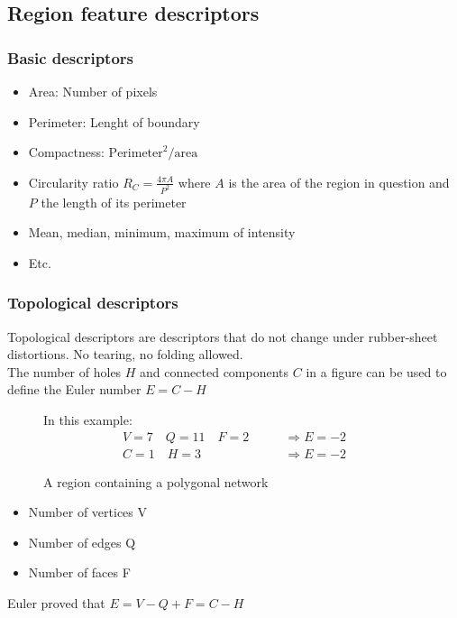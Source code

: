\subsection{Region feature descriptors}
\subsubsection{Basic descriptors}
\begin{itemize}
\item Area: Number of pixels
\item Perimeter: Lenght of boundary
\item Compactness: $\text{Perimeter}^2/\text{area}$
\item Circularity ratio $R_C=\frac{4\pi A}{P^2}$ where $A$ is the area of the region in question and $P$ the length of its perimeter
\item Mean, median, minimum, maximum of intensity
\item Etc.
\end{itemize}
\subsubsection{Topological descriptors}
Topological descriptors are descriptors that do not change under rubber-sheet distortions. No tearing, no folding allowed.\\
The number of holes $H$ and connected components $C$ in a figure can be used to define the Euler number $E=C-H$\\

\begin{figure}[h]
	\centering
	\caption{A region containing a polygonal network}

	In this example: \\
	\begin{align*}
	V=7 \quad Q=11 \quad F=2 \qquad &\Rightarrow E=-2 \\
	C=1 \quad H=3 \qquad &\Rightarrow E=-2
	\end{align*}

\end{figure}

\begin{itemize}
\item Number of vertices V
\item Number of edges Q
\item Number of faces F
\end{itemize}
Euler proved that $E=V-Q+F=C-H$
